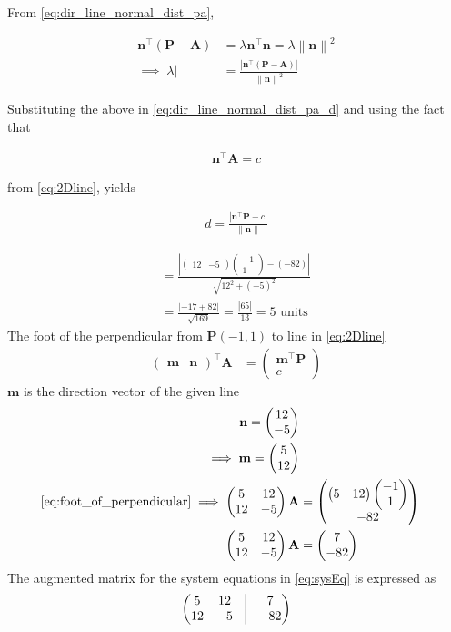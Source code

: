 \documentclass[12pt]{article}
\providecommand{\brak}[1]{\ensuremath{\left(#1\right)}}
\providecommand{\norm}[1]{\left\lVert#1\right\rVert}
\newcommand{\myvec}[1]{\ensuremath{\begin{pmatrix}#1\end{pmatrix}}}
\providecommand{\abs}[1]{\left\vert#1\right\vert}
\let\vec\mathbf
\begin{document}
\begin{enumerate}
From 
	\eqref{eq:dir_line_normal_dist_pa},

\begin{align}
	\vec{n}^{\top}
	\brak{\vec{P}- \vec{A}} &=  \lambda \vec{n}^{\top}\vec{n} = \lambda\norm{\vec{n}}^2
	\\
	\implies \abs{\lambda}&= \frac{\abs{\vec{n}^{\top}
	\brak{\vec{P}- \vec{A}}}}{\norm{\vec{n}}^2} 
\end{align}

Substituting the above in \eqref{eq:dir_line_normal_dist_pa_d} and using the fact that

\begin{align}
   \vec{n}^{\top}\vec{A} = c
\end{align}

from 	\eqref{eq:2Dline}, yields 

\begin{align}
	\label{eq:line_dist_2d}
	d = \frac{\abs{   \vec{n}^{\top}\vec{P}-c }}{\norm{\vec{n}}}	
\end{align}

\begin{align}
	= \frac{\abs{  \myvec{12 & -5 }\myvec{-1 \\ 1}-\brak{-82} }}{\sqrt{12^2+\brak{-5}^2}} \\	
	= \frac{\abs{  -17 + 82 }}{\sqrt{169}}	
	= \frac{\abs{65 }}{13}
	= 5 \text{ units }
\end{align}
The foot of the perpendicular from $\vec{P}(-1,1)$ to line in \eqref{eq:2Dline}
\begin{align}
	\label{eq:foot_of_perpendicular}
	\myvec{\vec{m} & \vec{n}}^\top\vec{A} &=	\myvec{
           \vec{m}^\top\vec{P}\\
	   c
	}
\end{align}
$\vec{m}$ is the direction vector of the given line
\begin{align}
    \vec{n} = \myvec{ 12 \\ -5} \\ 
    \implies\vec{m} = \myvec{ 5 \\ 12} \\ 
	\eqref{eq:foot_of_perpendicular} \implies \myvec{5&12 \\ 12 & -5}\vec{A} &= \myvec{\myvec{5 & 12}\myvec{-1 \\ 1}\\ -82} \\
	\label{eq:sysEq}
	\myvec{5&12 \\ 12 & -5}\vec{A} &= \myvec{7 \\ -82} 
\end{align}	
The augmented matrix for the system equations in \eqref{eq:sysEq} is expressed as
\begin{align}
	\myvec{5&12 & \vrule & 7 \\ 12 & -5 & \vrule & -82}
\end{align}
\end{enumerate}
\end{document}
